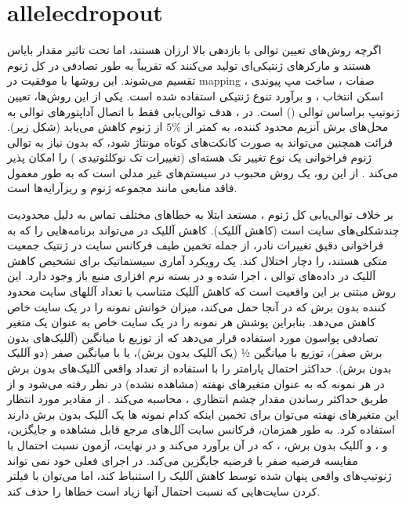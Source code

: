 \section{\gls{allelecdropout}}

اگرچه روش‌های تعیین توالی با بازدهی بالا \cite{hugo2007epithelial} ارزان هستند، اما تحت تاثیر مقدار بایاس هستند و مارکرهای ژنتیکی‌ای تولید می‌کنند که تقریباً به طور تصادفی در کل ژنوم تقسیم می‌شوند. این روشها با موفقیت در \gls{mapping} صفات \cite{nowell1976clonal, greaves2012clonal}، ساخت مپ پیوندی \cite{sakr1993frequency, fearon1990genetic}،  اسکن انتخاب  \cite{dentro2018portraits, waclaw2015spatial}،  و برآورد تنوع ژنتیکی \cite{de2006clonal} استفاده شده است. یکی از این روش‌ها، تعیین ژنوتیپ براساس توالی \cite{anderson2011genetic} () است. در ، هدف توالی‌یابی فقط با اتصال آداپتورهای توالی به محل‌های برش آنزیم محدود کننده، به کمتر از $5\%$ از ژنوم کاهش می‌یابد (شکل زیر).  قرائت  همچنین می‌تواند به صورت کانکت‌های کوتاه مونتاژ شود، که بدون نیاز به توالی ژنوم فراخوانی یک نوع تغییر تک هسته‌ای (تغییرات تک نوکلئوتیدی ) را امکان پذیر می‌کند \cite{hanahan2000hallmarks}. از این رو،  یک روش محبوب در سیستم‌های غیر مدلی است که به طور معمول فاقد منابعی مانند مجموعه ژنوم و ریزآرایه‌ها است.

بر خلاف توالی‌یابی کل ژنوم ،  مستعد ابتلا به خطاهای مختلف تماس به دلیل محدودیت چندشکلی‌های سایت  است (کاهش آللیک). کاهش آللیک در  می‌تواند برنامه‌هایی را که به فراخوانی دقیق تغییرات نادر، از جمله تخمین طیف فرکانس سایت در ژنتیک جمعیت متکی هستند، را دچار اختلال کند. یک رویکرد آماری سیستماتیک برای تشخیص کاهش آللیک در داده‌های توالی ، اجرا شده و  در بسته نرم افزاری منبع باز  وجود دارد.  این روش مبتنی بر این واقعیت است که کاهش آللیک متناسب با تعداد آللهای سایت محدود کننده بدون برش که در آنجا حمل می‌کند، میزان خوانش نمونه را در یک سایت خاص کاهش می‌دهد. بنابراین  پوشش هر نمونه را در یک سایت خاص به عنوان یک متغیر تصادفی پواسون مورد استفاده قرار می‌دهد که از توزیع با میانگین \lr{$\lambda$} (آللیک‌های بدون برش صفر)، توزیع با میانگین ½\lr{$\lambda$} (یک آللیک بدون برش)، یا با میانگین صفر (دو آللیک بدون برش).  حداکثر احتمال پارامتر \lr{$\lambda$} را با استفاده از تعداد واقعی آللیک‌های بدون برش در هر نمونه که به عنوان متغیرهای نهفته (مشاهده نشده) در نظر رفته می‌شود و از طریق  حداکثر رساندن  مقدار چشم انتظاری ، محاسبه می‌کند . از مقادیر مورد انتظار این متغیرهای نهفته می‌توان برای تخمین اینکه کدام نمونه ها یک آللیک بدون برش دارند استفاده کرد. به طور همزمان،  فرکانس سایت آلل‌های  مرجع قابل مشاهده و جایگزین،  و    ، و آللیک بدون برش،  ، که در آن     برآورد می‌کند و در نهایت، آزمون نسبت احتمال با مقایسه فرضیه صفر   با فرضیه  جایگزین می‌کند.   در اجرای فعلی خود نمی تواند ژنوتیپ‌های واقعی پنهان شده توسط کاهش آللیک را استنباط کند، اما می‌توان با فیلتر کردن سایت‌هایی که نسبت احتمال آنها زیاد است خطاها را حذف کند.

